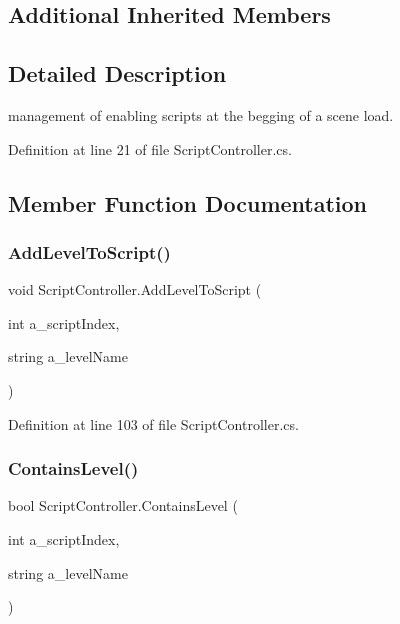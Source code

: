 \subsection*{Additional Inherited Members}


\subsection{Detailed Description}
management of enabling scripts at the begging of a scene load. 



Definition at line 21 of file Script\+Controller.\+cs.



\subsection{Member Function Documentation}
\mbox{\label{class_script_controller_a393d619523c40e6bdbdc3eb6827e0471}} 
\subsubsection{\texorpdfstring{Add\+Level\+To\+Script()}{AddLevelToScript()}}
{\footnotesize\ttfamily void Script\+Controller.\+Add\+Level\+To\+Script (\begin{DoxyParamCaption}\item[{int}]{a\+\_\+script\+Index,  }\item[{string}]{a\+\_\+level\+Name }\end{DoxyParamCaption})}



Definition at line 103 of file Script\+Controller.\+cs.

\mbox{\label{class_script_controller_af6d363e91530835cb06a29ae66cfdeb3}} 
\subsubsection{\texorpdfstring{Contains\+Level()}{ContainsLevel()}}
{\footnotesize\ttfamily bool Script\+Controller.\+Contains\+Level (\begin{DoxyParamCaption}\item[{int}]{a\+\_\+script\+Index,  }\item[{string}]{a\+\_\+level\+Name }\end{DoxyParamCaption})}



